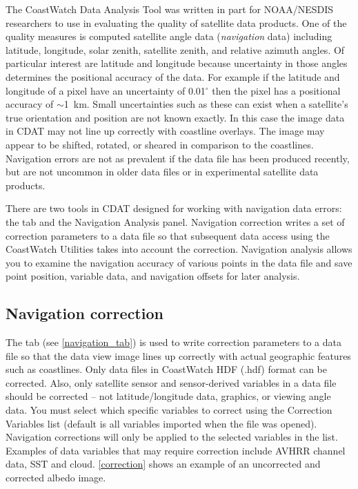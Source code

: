 The CoastWatch Data Analysis Tool was written in part for
NOAA/NESDIS researchers to use in evaluating the quality of
satellite data products.  One of the quality measures is computed
satellite angle data ({\em navigation} data) including latitude,
longitude, solar zenith, satellite zenith, and relative azimuth
angles.  Of particular interest are latitude and longitude because
uncertainty in those angles determines the positional accuracy of
the data.  For example if the latitude and longitude of a pixel
have an uncertainty of 0.01$^{\circ}$ then the pixel has a
positional accuracy of $\sim$1~km.  Small uncertainties such as
these can exist when a satellite's true orientation and position
are not known exactly. In this case the image data in CDAT may
not line up correctly with coastline overlays. The image may
appear to be shifted, rotated, or sheared in comparison to the
coastlines.  Navigation errors are not as prevalent if the data
file has been produced recently, but are not uncommon in older
data files or in experimental satellite data products.

There are two tools in CDAT designed for working with navigation
data errors: the 
tab and the {\gui Navigation Analysis} panel.  Navigation
correction writes a set of correction parameters to a data file
so that subsequent data access using the CoastWatch Utilities
takes into account the correction.  Navigation analysis allows
you to examine the navigation accuracy of various points in the
data file and save point position, variable data, and navigation
offsets for later analysis.

\subsection{Navigation correction}

The  tab (see
\autoref{navigation_tab}) is used to write correction parameters
to a data file so that the data view image lines up correctly
with actual geographic features such as coastlines.  Only data
files in CoastWatch HDF (.hdf)
format can be corrected.  Also, only satellite sensor and
sensor-derived variables in a data file should be corrected --
not latitude/longitude data, graphics, or viewing angle data. You
must select which specific variables to correct using the
{\gui Correction Variables} list (default is all variables
imported when the file was opened).  Navigation corrections will
only be applied to the selected variables in the list.  Examples
of data variables that may require correction include AVHRR
channel data, SST and cloud. \autoref{correction} shows an
example of an uncorrected and corrected albedo image.

